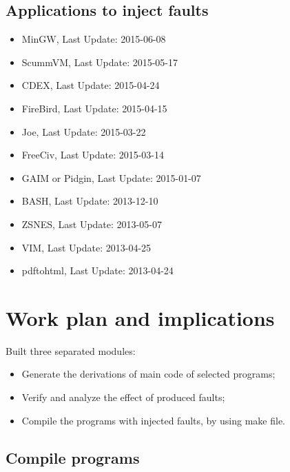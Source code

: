 \clearpage
\subsection{Applications to inject faults}


\begin{itemize}
	\item MinGW, Last Update: 2015-06-08
	\item ScummVM, Last Update: 2015-05-17
	\item CDEX, Last Update: 2015-04-24
	\item FireBird, Last Update: 2015-04-15
	\item Joe, Last Update: 2015-03-22
	\item FreeCiv, Last Update: 2015-03-14
	\item GAIM or Pidgin, Last Update: 2015-01-07
	\item BASH, Last Update: 2013-12-10
	\item ZSNES, Last Update: 2013-05-07
	\item VIM, Last Update: 2013-04-25
	\item pdftohtml, Last Update: 2013-04-24
\end{itemize}

\newpage
\section{Work plan and implications}

Built three separated modules:

\begin{itemize}
	\item Generate the derivations of main code of selected programs;
	\item Verify and analyze the effect of produced faults;
	\item Compile the programs with injected faults, by using make file.
\end{itemize}






\subsection{Compile programs}


